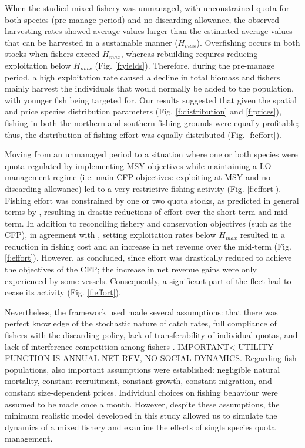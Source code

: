 \documentclass[12pt,oneline,a4paper,numbib]{ouparticle}
\numberwithin{equation}{subsection} %
\begin{document}
When the studied mixed fishery was unmanaged, with unconstrained quota for both species (pre-manage period) and no discarding allowance, the observed harvesting rates showed average values larger than the estimated average values that can be harvested in a sustainable manner ($H_{max}$). Overfishing occurs in both stocks when fishers exceed $H_{max}$, whereas rebuilding requires reducing exploitation below $H_{max}$ (Fig. \ref{f:yields}).  Therefore, during the pre-manage period, a high exploitation rate caused a decline in total biomass and fishers mainly harvest the individuals that would normally be added to the population, with younger fish being targeted for. Our results suggested that given the spatial and price species distribution parameters (Fig. \ref{f:distribution} and \ref{f:prices}), fishing in both the northern and southern fishing grounds were equally profitable; thus, the distribution of fishing effort was equally distributed (Fig. \ref{f:effort}). 

Moving from an unmanaged period to a situation where one or both species were quota regulated by implementing MSY objectives while maintaining a LO management regime (i.e. main CFP objectives: exploiting at MSY and no discarding allowance) led to a very restrictive fishing activity (Fig. \ref{f:effort}). Fishing effort was constrained by one or two quota stocks, as predicted in general terms by \cite{Ulrich2017}, resulting in drastic reductions of effort over the short-term and mid-term. In addition to reconciling fishery and conservation objectives (such as the CFP), in agreement with \cite{Grafton2007}, setting exploitation rates below $H_{max}$ resulted in a reduction in fishing cost and an increase in net revenue over the mid-term (Fig. \ref{f:effort}). However, as \cite{Prellezo2016a} concluded, since effort was drastically reduced to achieve the objectives of the CFP; the increase in net revenue gains were only experienced by some vessels. Consequently, a significant part of the fleet had to cease its activity (Fig. \ref{f:effort}).

Nevertheless, the framework used made several assumptions: that there was perfect knowledge of the stochastic nature of catch rates, full compliance of fishers with the discarding policy, lack of transferability of individual quotas, and lack of interference competition among fishers \cite{Alzorriz2018}. IMPORTANT< UTILITY FUNCTION IS ANNUAL NET REV, NO SOCIAL DYNAMICS. Regarding fish populations, also important assumptions were established: negligible natural mortality, constant recruitment, constant growth, constant migration, and constant size-dependent prices. Individual choices on fishing behaviour were assumed to be made once a month. However, despite these assumptions, the minimum realistic model developed in this study allowed us to simulate the dynamics of a mixed fishery and examine the effects of single species quota management. 
\end{document}
